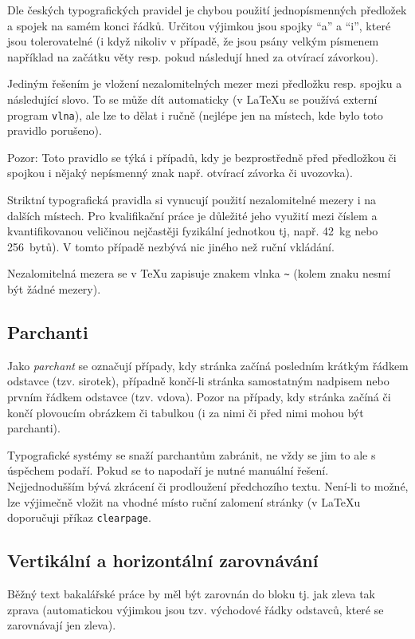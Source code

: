 \documentclass[male,czech,api_bc]{kitheses}
\begin{document}
Dle českých typografických pravidel je chybou použití jednopísmenných předložek a spojek na samém konci řádků. 
Určitou výjimkou jsou spojky \enquote{a} a \enquote{i}, které jsou tolerovatelné (i když nikoliv v případě, že jsou psány velkým písmenem například na začátku věty resp. pokud následují hned za otvírací závorkou).

Jediným řešením je vložení nezalomitelných mezer mezi předložku resp. spojku a následující slovo. To se může dít automaticky (v \LaTeX u se používá externí program \texttt{vlna}), ale lze to dělat i ručně (nejlépe jen  na místech, kde bylo toto pravidlo porušeno).

Pozor: Toto pravidlo se týká i případů, kdy je bezprostředně před předložkou či spojkou i nějaký nepísmenný znak např. otvírací závorka či uvozovka).

Striktní typografická pravidla si vynucují použití nezalomitelné mezery i na dalších místech. Pro kvalifikační práce je důležité jeho využití mezi číslem a kvantifikovanou veličinou nejčastěji fyzikální jednotkou tj, např. 42~kg nebo 256~bytů). V tomto případě nezbývá nic jiného než ruční vkládání.

Nezalomitelná mezera se v \TeX{}u zapisuje znakem vlnka \texttt{\textasciitilde} (kolem znaku nesmí být žádné mezery).

\subsection{Parchanti}

Jako \textit{parchant} se označují případy, kdy stránka začíná posledním krátkým řádkem odstavce (tzv. sirotek), případně končí-li stránka samostatným nadpisem nebo prvním řádkem odstavce (tzv. vdova). Pozor na případy, kdy stránka začíná či končí plovoucím obrázkem či tabulkou (i za nimi či před nimi mohou být parchanti).

Typografické systémy se snaží parchantům zabránit, ne vždy se jim to ale s úspěchem podaří. Pokud se to napodaří je nutné manuální řešení. Nejjednodušším bývá zkrácení či prodloužení předchozího textu. Není-li to možné, lze výjimečně vložit na vhodné místo ruční zalomení stránky (v \LaTeX{}u doporučuji příkaz \verb!clearpage!.

\subsection{Vertikální a horizontální zarovnávání}

Běžný text bakalářské práce by měl být zarovnán do bloku tj. jak zleva tak zprava (automatickou výjimkou jsou tzv. východové řádky odstavců, které se zarovnávají jen zleva).
\end{document}
